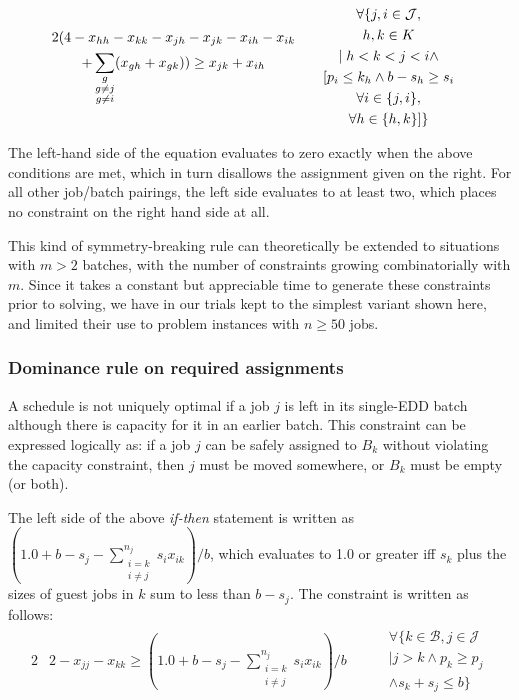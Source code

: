 \documentclass[oribibl]{llncs}
\begin{document}
\begin{alignat}{2}
  & \begin{gathered} 2 (  4 - x_{hh} - x_{kk} - x_{jh} - x_{jk} -
x_{ih} - x_{ik}\hfill \\+ \sum_{\substack{{g}\\{g \neq j}\\{g \neq
i}}} (x_{gh} + x_{gk}) ) \geq x_{jk} + x_{ih} \end{gathered}
\quad && \begin{gathered} \forall\{ j, i \in \mathcal{J}, \\ h, k \in K \\|\; h < k <
j < i \land \\ [p_i \leq k_h \land b - s_h \geq s_i\\ \forall i \in
\{j,i\}, \\ \forall h
\in \{h,k\}] \} \end{gathered}
\end{alignat}

The left-hand side of the equation evaluates to zero exactly when the above
conditions are met, which in turn disallows the assignment given on the right.
For all other job/batch pairings, the left side evaluates to at least two, which
places no constraint on the right hand side at all.

This kind of symmetry-breaking rule can theoretically be extended to situations with
$m > 2$ batches, with the number of constraints growing combinatorially with $m$. Since it takes
a constant but appreciable time to generate these constraints prior to solving,
we have in our trials kept to the simplest variant shown here, and limited their
use to problem instances with $n \geq 50$ jobs.

\subsubsection{Dominance rule on required assignments}
A schedule is not uniquely optimal if a job $j$ is left in its single-EDD batch
although there is capacity for it in an earlier batch. This constraint can
be expressed logically as: if a job $j$ can be safely assigned to $B_k$ without
violating the capacity constraint, then $j$ must be moved somewhere, or
$B_k$ must be empty (or both). 

The left side of the above \textit{if-then} statement is written as $(1.0 + b -
s_j - \sum_{\substack{{i = k}\\{i \neq j}}}^{n_j} s_i x_{ik}) / b$, which
evaluates to 1.0 or greater iff $s_k$ plus the sizes of guest jobs in $k$ sum to
less than $b - s_j$. The constraint is written as follows:
\begin{alignat}{2}
&2 - x_{jj} - x_{kk} \geq \left(1.0 + b - s_j -
\sum_{\substack{{i = k}\\{i \neq j}}}^{n_j} s_i
x_{ik}\right) / b \quad && \begin{gathered} \forall \{k \in \mathcal{B}, j \in \mathcal{J} \\| j > k 
\land p_k \geq p_j \\ \land s_k + s_j \leq b\}\end{gathered}
\end{alignat}\\
\end{document}
